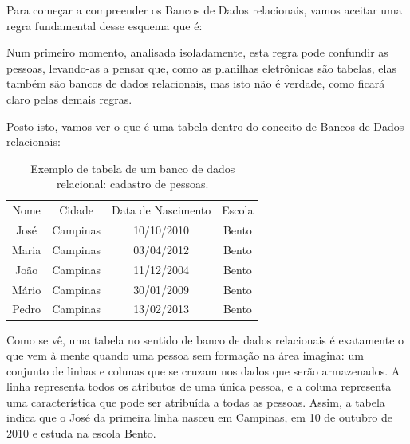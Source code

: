 Para começar a compreender os Bancos de Dados relacionais, vamos aceitar uma regra fundamental desse esquema que é:


\noindent\begin{flushright}\mbox{\linespread{1}\selectfont\centering{}}\end{flushright}


Num primeiro momento, analisada isoladamente, esta regra pode confundir as pessoas, levando-as a pensar que, como as planilhas eletrônicas são tabelas, elas também são bancos de dados relacionais, mas isto não é verdade, como ficará claro pelas demais regras.

Posto isto, vamos ver o que é uma tabela dentro do conceito de Bancos de Dados relacionais:





\begin{table}[htb]
\tiny
\caption{\label{19e28cfdeba98e03e062e9c442b749a7cc006c08}Exemplo de tabela de um banco de dados relacional: cadastro de pessoas.}

\centering
\begin{tabular}{|c|c|c|c|}
\hline
Nome  &  Cidade  &  Data de Nascimento  &  Escola \\
José  &  Campinas  &  10/10/2010  &  Bento \\
Maria  &  Campinas  &  03/04/2012  &  Bento \\
João  &  Campinas  &  11/12/2004  &  Bento \\
Mário  &  Campinas  &  30/01/2009  &  Bento \\
Pedro  &  Campinas  &  13/02/2013  &  Bento \\
\hline
\end{tabular}
\end{table}


Como se vê, uma tabela no sentido de banco de dados relacionais é exatamente o que vem à mente quando uma pessoa sem formação na área imagina: um conjunto de linhas e colunas que se cruzam nos dados que serão armazenados. A linha representa todos os atributos de uma única pessoa, e a coluna representa uma característica que pode ser atribuída a todas as pessoas. Assim, a tabela indica que o  José da primeira linha nasceu em Campinas, em 10 de outubro de 2010 e estuda na escola Bento.

